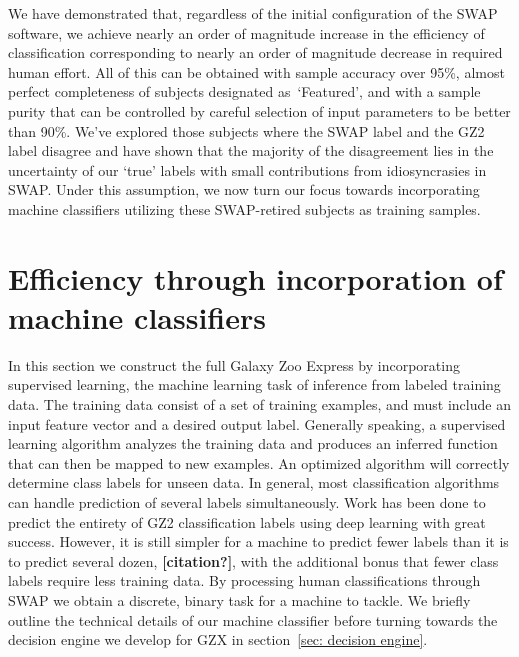 \documentclass[twocolumn]{aastex6}
\newcommand{\feat}{`Featured'}
\begin{document}
We have demonstrated that, regardless of the initial configuration of the SWAP 
software, we achieve nearly an order of magnitude increase in the efficiency of 
classification corresponding to nearly an order of magnitude decrease in
required human effort. All of this can be obtained with sample accuracy over 95\%, 
almost perfect completeness of subjects designated as~\feat, and with a sample purity
that can be controlled by careful selection of input parameters to be better than 90\%. 
We've explored those subjects where the SWAP label and the GZ2 label disagree
and have shown that the majority of the disagreement lies in the uncertainty of 
our `true' labels with small contributions from idiosyncrasies in SWAP. 
Under this assumption, we now turn our focus towards incorporating machine
classifiers utilizing these SWAP-retired subjects as training samples. 


\section{Efficiency through incorporation of machine classifiers} \label{sec:machine}

In this section we construct the full Galaxy Zoo Express by incorporating supervised 
learning, the machine learning task of inference from labeled training data. 
The training data consist of a set of training examples, and must include
an input feature vector and a desired output label.  Generally speaking,
a supervised learning algorithm analyzes the training data and produces an inferred 
function that can then be mapped to new examples. An optimized algorithm will 
correctly determine class labels for unseen data. In general, most classification 
algorithms can handle prediction of several labels simultaneously. Work has been
done to predict the entirety of GZ2 classification labels using deep learning 
\citep{Dieleman2015} with great success. However, it is still simpler for a machine
to predict fewer labels than it is to predict several dozen, \textbf{[citation?]}, 
with the additional bonus that fewer class labels require less training data. 
By processing human classifications through SWAP we obtain a discrete, binary task
for a machine to tackle. We briefly outline the technical details of our machine
classifier before turning towards the decision engine we develop for GZX in 
section~\ref{sec: decision engine}. 
\end{document}
